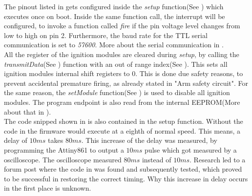 \noindent The pinout listed in  gets configured inside the \textit{setup} function(See ) which executes once on boot. Inside the same function call, the interrupt will be configured, to invoke a function called \textit{fire} if the pin voltage level changes from low to high on pin 2.  Furthermore, the baud rate for the TTL serial communication is set to \textit{57600}. More about the serial communication in .\\



\noindent All the register of the ignition modules are cleared during \textit{setup}, by calling the \textit{transmitData}(See ) function with an out of range index(See ). This sets all ignition modules internal shift registers to 0. This is done due safety reasons, to prevent accidental premature firing, as already stated in  "Arm safety circuit". For the same reason, the \textit{setModule} function(See ) is used to disable all ignition modules. The program endpoint is also read from the internal EEPROM(More about that in ).\\



\noindent The code snipped shown in  is also contained in the setup function. Without the code in  the firmware would execute at a eighth of normal speed. This means, a delay of $10ms$ takes $80ms$. This increase of the delay was measured, by programming the Attiny861 to output a $10ms$ pulse which got measured by a oscilloscope. The oscilloscope measured $80ms$ instead of $10ms$. Research led to a forum post where the code in  was found and subsequently tested, which proved to be successful in restoring the correct timing. Why this increase in delay occurs in the first place is unknown.



